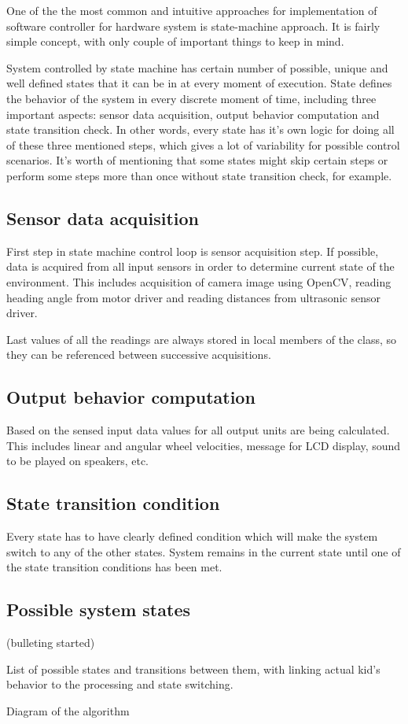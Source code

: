 
One of the the most common and intuitive approaches for implementation of software controller for hardware system is state-machine approach. It is fairly simple concept, with only couple of important things to keep in mind. 

System controlled by state machine has certain number of possible, unique and well defined states that it can be in at every moment of execution. State defines the behavior of the system in every discrete moment of time, including three important aspects: sensor data acquisition, output behavior computation and state transition check. In other words, every state has it\rq{}s own logic for doing all of these three mentioned steps, which gives a lot of variability for possible control scenarios. It\rq{}s worth of mentioning that some states might skip certain steps or perform some steps more than once without state transition check, for example.

\subsection{Sensor data acquisition}

First step in state machine control loop is sensor acquisition step. If possible, data is acquired from all input sensors in order to determine current state of the environment. This includes acquisition of camera image using OpenCV, reading heading angle from motor driver and reading distances from ultrasonic sensor driver.

Last values of all the readings are always stored in local members of the class, so they can be referenced between successive acquisitions.

\subsection{Output behavior computation}

Based on the sensed input data values for all output units are being calculated. This includes linear and angular wheel velocities, message for LCD display, sound to be played on speakers, etc.

\subsection{State transition condition}

Every state has to have clearly defined condition which will make the system switch to any of the other states. System remains in the current state until one of the state transition conditions has been met.

\subsection{Possible system states}

(bulleting started)

List of possible states and transitions between them, with linking actual kid\rq{}s behavior to the processing and state switching.

Diagram of the algorithm
